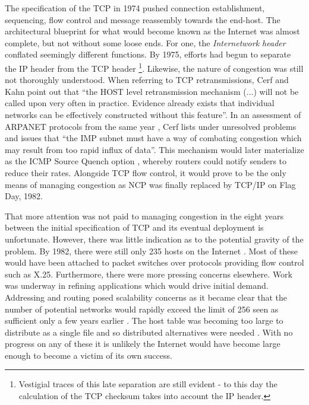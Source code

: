 The specification of the \ac{TCP} \cite{Cerf:2005p452} in 1974 pushed connection establishment, sequencing, flow control and message reassembly towards the end-host.
The architectural blueprint for what would become known as the Internet was almost complete, but not without some loose ends. 
For one, the \textit{Internetwork header} conflated seemingly different functions. 
By 1975, efforts had begun to separate the \ac{IP} header from the \ac{TCP} header \footnote{Vestigial traces of this late separation are still evident - to this day the calculation of the \ac{TCP} checksum takes into account the \ac{IP} header.}.
Likewise, the nature of congestion was still not thoroughly understood.
When referring to \ac{TCP} retransmissions, Cerf and Kahn point out that ``the HOST level retransmission mechanism (...) will not be called upon very often in practice. Evidence already exists that individual networks can be effectively constructed without this feature''. 
In an assessment of \ac{ARPANET} protocols from the same year \cite{Cerf:1974p455}, Cerf lists under unresolved problems and issues that ``the \ac{IMP} subnet must have a way of combating congestion which may result from too rapid influx of data''.
This mechanism would later materialize as the \ac{ICMP} Source Quench option \cite{Postel:1981p463}, whereby routers could notify senders to reduce their rates. 
Alongside \ac{TCP} flow control, it would prove to be the only means of managing congestion as \ac{NCP} was finally replaced by \ac{TCP}/\ac{IP} on Flag Day, 1982.

That more attention was not paid to managing congestion in the eight years between the initial specification of \ac{TCP} and its eventual deployment is unfortunate. 
However, there was little indication as to the potential gravity of the problem.
By 1982, there were still only 235 hosts on the Internet \cite{Lottor:1992p459}. 
Most of these would have been attached to packet switches over protocols providing flow control such as X.25. 
Furthermore, there were more pressing concerns elsewhere. Work was underway in refining applications which would drive initial demand. Addressing and routing posed scalability concerns as it became clear that the number of potential networks would rapidly exceed the limit of 256 seen as sufficient only a few years earlier \cite{Cerf:2005p452}. The host table was becoming too large to distribute as a single file and so distributed alternatives were needed \cite{Mockapetris:1987p527,Birrell:1981p457}. With no progress on any of these it is unlikely the Internet would have become large enough to become a victim of its own success.

